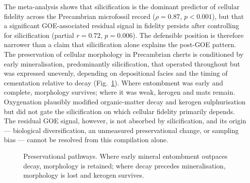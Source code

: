 \documentclass[11pt]{article}
\begin{document}
The meta-analysis shows that silicification is the dominant predictor of cellular fidelity across
the Precambrian microfossil record ($\rho = 0.87$, $p < 0.001$), but that a significant
GOE-associated residual signal in fidelity persists after controlling for silicification (partial
$r = 0.72$, $p = 0.006$). The defensible position is therefore narrower than a claim that
silicification alone explains the post-GOE pattern. The preservation of cellular morphology in
Precambrian cherts is conditioned by early mineralisation, predominantly silicification, that
operated throughout but was expressed unevenly, depending on depositional facies and the timing of
cementation relative to decay (Fig.~\ref{fig:model}). Where entombment was early and complete,
morphology survives; where it was weak, kerogen and mats remain. Oxygenation plausibly modified
organic-matter decay and kerogen sulphurisation \citep{Lepot2009,Decraene2021} but did not gate the
silicification on which cellular fidelity primarily depends. The residual GOE signal, however, is
not absorbed by silicification, and its origin --- biological diversification, an unmeasured
preservational change, or sampling bias --- cannot be resolved from this compilation alone.

\begin{figure}[t]
\centering
{}
\caption{Preservational pathways. Where early mineral entombment outpaces decay, morphology is
retained; where decay precedes mineralisation, morphology is lost and kerogen survives.}
\label{fig:model}
\end{figure}
\end{document}
